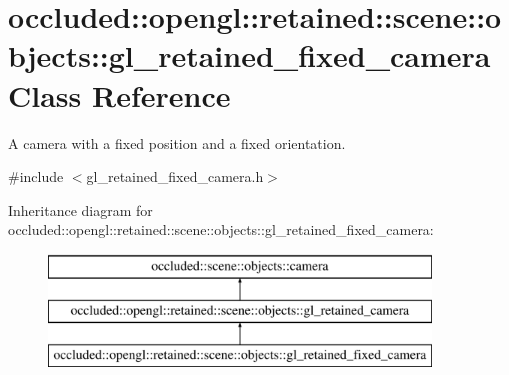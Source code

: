 \hypertarget{classoccluded_1_1opengl_1_1retained_1_1scene_1_1objects_1_1gl__retained__fixed__camera}{\section{occluded\+:\+:opengl\+:\+:retained\+:\+:scene\+:\+:objects\+:\+:gl\+\_\+retained\+\_\+fixed\+\_\+camera Class Reference}
\label{classoccluded_1_1opengl_1_1retained_1_1scene_1_1objects_1_1gl__retained__fixed__camera}
}


A camera with a fixed position and a fixed orientation.  




{\ttfamily \#include $<$gl\+\_\+retained\+\_\+fixed\+\_\+camera.\+h$>$}

Inheritance diagram for occluded\+:\+:opengl\+:\+:retained\+:\+:scene\+:\+:objects\+:\+:gl\+\_\+retained\+\_\+fixed\+\_\+camera\+:\begin{figure}[H]
\begin{center}
\leavevmode
\includegraphics[height=3.000000cm]{classoccluded_1_1opengl_1_1retained_1_1scene_1_1objects_1_1gl__retained__fixed__camera}
\end{center}
\end{figure}
